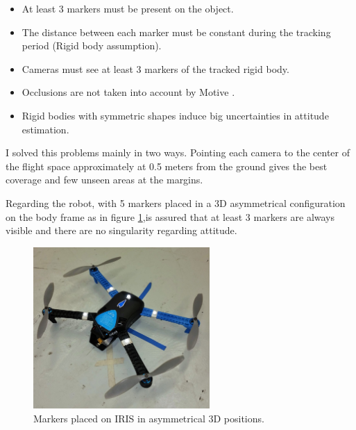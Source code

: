\begin{itemize}
\item At least 3 markers must be present on the object.
\item The distance between each marker must be constant during the tracking period (Rigid body assumption).
\item Cameras must see at least 3 markers of the tracked rigid body.
\item Occlusions are not taken into account by Motive \cite{OptiT}.
\item Rigid bodies with symmetric shapes induce big uncertainties in attitude estimation.
\end{itemize}
I solved this problems mainly in two ways. Pointing each camera to the center of the flight space approximately at 0.5 meters from the ground gives the best coverage and few unseen areas at the margins.

Regarding the robot, with 5 markers placed in a 3D asymmetrical configuration  on the body frame as in figure \ref{figure:markedIRIS},is assured that at least 3 markers are always visible and there are no singularity regarding attitude.

\begin{figure}[h]
\centering
 \includegraphics[width=0.6\textwidth]{irismarker.jpg}
 \caption[Marker placement on IRIS]{Markers placed on IRIS in asymmetrical 3D positions.}
 \label{figure:markedIRIS}
\end{figure}

